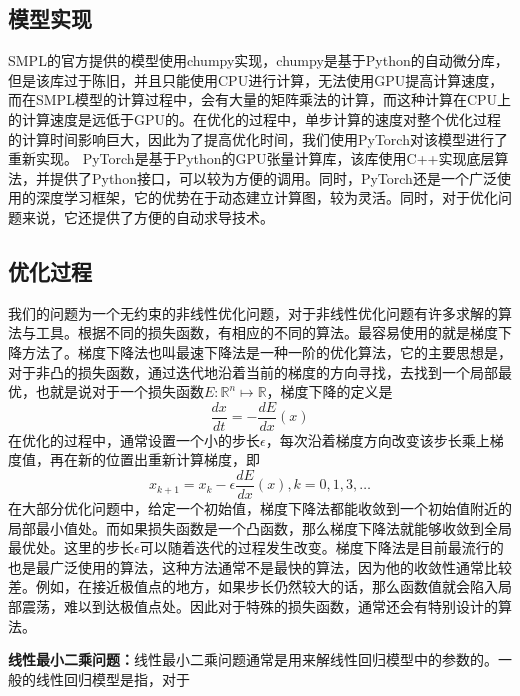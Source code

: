 \subsection{模型实现}
SMPL的官方提供的模型使用chumpy\cite{chumpy}实现，chumpy是基于Python的自动微分库，但是该库过于陈旧，并且只能使用CPU进行计算，无法使用GPU提高计算速度，而在SMPL模型的计算过程中，会有大量的矩阵乘法的计算，而这种计算在CPU上的计算速度是远低于GPU的。在优化的过程中，单步计算的速度对整个优化过程的计算时间影响巨大，因此为了提高优化时间，我们使用PyTorch对该模型进行了重新实现。
PyTorch是基于Python的GPU张量计算库，该库使用C++实现底层算法，并提供了Python接口，可以较为方便的调用。同时，PyTorch还是一个广泛使用的深度学习框架，它的优势在于动态建立计算图，较为灵活。同时，对于优化问题来说，它还提供了方便的自动求导技术。


\subsection{优化过程}
我们的问题为一个无约束的非线性优化问题，对于非线性优化问题有许多求解的算法与工具。根据不同的损失函数，有相应的不同的算法。最容易使用的就是梯度下降方法了。梯度下降法也叫最速下降法是一种一阶的优化算法，它的主要思想是，对于非凸的损失函数，通过迭代地沿着当前的梯度的方向寻找，去找到一个局部最优，也就是说对于一个损失函数\(E: \mathbb{R}^n \mapsto \mathbb{R}\)，梯度下降的定义是
\begin{equation}
    \frac{dx}{dt} = - \frac{dE}{dx}(x)
\end{equation}
在优化的过程中，通常设置一个小的步长\(\epsilon\)，每次沿着梯度方向改变该步长乘上梯度值，再在新的位置出重新计算梯度，即
\begin{equation}
    x_{k+1} = x_k - \epsilon \frac{dE}{dx}(x), k = 0,1,3,\ldots
\end{equation}
在大部分优化问题中，给定一个初始值，梯度下降法都能收敛到一个初始值附近的局部最小值处。而如果损失函数是一个凸函数，那么梯度下降法就能够收敛到全局最优处。这里的步长\(\epsilon\)可以随着迭代的过程发生改变。梯度下降法是目前最流行的也是最广泛使用的算法，这种方法通常不是最快的算法，因为他的收敛性通常比较差。例如，在接近极值点的地方，如果步长仍然较大的话，那么函数值就会陷入局部震荡，难以到达极值点处。因此对于特殊的损失函数，通常还会有特别设计的算法。

\textbf{线性最小二乘问题：}线性最小二乘问题通常是用来解线性回归模型中的参数的。一般的线性回归模型是指，对于

